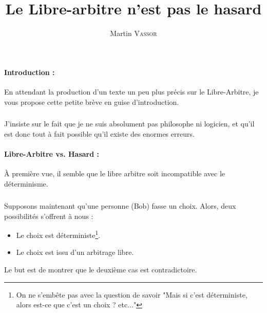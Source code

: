 \documentclass{article}
\title{Le Libre-arbitre n'est pas le hasard}
\author{Martin \textsc{Vassor}}
\begin{document}
\maketitle

\paragraph{Introduction :}
En attendant la production d'un texte un peu plus précis sur le Libre-Arbitre, 
je vous propose cette petite brève en guise d'introduction.
\subparagraph{}
J'insiste sur le fait que je ne suis absolument pas philosophe ni logicien, et 
qu'il est donc tout à fait possible qu'il existe des enormes erreurs.

\paragraph{Libre-Arbitre vs. Hasard :}
À première vue, il semble que le libre arbitre soit incompatible avec le 
déterminisme. 
\subparagraph{}
Supposons maintenant qu'une personne (Bob) fasse un choix. Alors, deux 
possibilités s'offrent à nous : 
\begin{itemize}
	\item Le choix est déterministe\footnote{On ne s'embête pas avec la 
			question de savoir "Mais si c'est déterministe, alors 
		est-ce que c'est un choix ? etc..."}.
	\item Le choix est issu d'un arbitrage libre.
\end{itemize}

Le but est de montrer que le deuxième cas est contradictoire.
\end{document}
